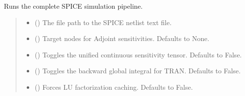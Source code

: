 \documentclass[letterpaper,10pt,english]{sphinxmanual}
\begin{document}
\begin{fulllineitems}
\label{\detokenize{simulation_core:run_simulation_core}}
\pysigstartsignatures
\pysiglinewithargsret
{}
{\sphinxparamcomma {}\sphinxparamcomma {}\sphinxparamcomma {}\sphinxparamcomma {}}
{}
\pysigstopsignatures
\sphinxAtStartPar
Runs the complete SPICE simulation pipeline.
\begin{quote}\begin{description}
\begin{itemize}
\item {} 
\sphinxAtStartPar
{} () \textendash{} The file path to the SPICE netlist text file.

\item {} 
\sphinxAtStartPar
{} (\sphinxstyleliteralemphasis{\sphinxupquote{, }}) \textendash{} Target nodes for Adjoint sensitivities. Defaults to None.

\item {} 
\sphinxAtStartPar
{} (\sphinxstyleliteralemphasis{\sphinxupquote{, }}) \textendash{} Toggles the unified continuous sensitivity tensor. Defaults to False.

\item {} 
\sphinxAtStartPar
{} (\sphinxstyleliteralemphasis{\sphinxupquote{, }}) \textendash{} Toggles the backward global integral for TRAN. Defaults to False.

\item {} 
\sphinxAtStartPar
{} (\sphinxstyleliteralemphasis{\sphinxupquote{, }}) \textendash{} Forces LU factorization caching. Defaults to False.


\end{itemize}
\end{description}
\end{quote}
\end{fulllineitems}
\end{document}
